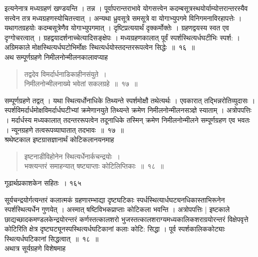\documentclass[11pt, openany]{book}
\begin{document}
\begin{sloppypar}
 इत्यनेनात्र मध्यग्रहणं खण्डयन्ति । तन्न । पूर्वापरान्तराभावे योगसत्त्वेन कदम्बसूत्रस्थयोर्याम्योत्तरान्तरस्यैव सत्त्वेन तत्र मध्यग्रहणस्योचितत्त्वात् । अन्यथा ध्रुवसूत्रे समसूत्रे वा योगाभ्युपगमे विनिगमनाविरहापत्तेः । यथागतग्रहयोः कदम्बसूत्रेणैव योगाभ्युपगमात् । दृष्टिप्रत्ययार्थं दृक्कर्मोक्तेः । ग्रहणद्वयस्य स्वत एव दृग्गोचरत्वात् । ग्रहद्वयादर्शनाच्चेत्यादिसङ्क्षेपः । मध्यग्रहणकालात् पूर्वं स्पर्शस्थित्यर्धघटीभिः स्पर्श: । अग्रिमकाले मोक्षस्थित्यर्धघटोभिर्मोक्षः स्थित्यर्धयोस्तदन्तररूपत्वेन सिद्धेः~॥~१६~॥\\
\noindent अथ सम्पूर्णग्रहणे निमीलनोन्मीलनकालावप्याह\textendash
\end{sloppypar}


\begin{quote}
  {\ssi तद्वदेव विमर्दार्धनाडिकाहीनसंयुते~।\\
निमीलनोन्मीलनाख्ये भवेतां सकलग्रहे~॥~१७~॥}
\end{quote}

\begin{sloppypar}
 सम्पूर्णग्रहणे तद्वत् । यथा स्थित्यर्धोनाधिके तिथ्यन्ते स्पर्शमोक्षौ तथेत्यर्थः । एवकारात् तद्भिन्नरोतिव्युदासः । स्पर्शविमर्दार्धमोक्षविमर्दार्धघटीभ्यां क्रमेणानयुते तिथ्यन्ते क्रमेण निमीलनोन्मीलनसञ्ज्ञे स्याताम् । अत्रोपपत्तिः । मर्दार्धस्य मध्यकालात् तदन्तररूपत्वेन तदूनाधिके तस्मिन् क्रमेण निमीलनोन्मीलने सम्पूर्णग्रहण एव भवतः । न्यूनग्रहणे तत्वरूपव्याघातात् तदभावः~॥~१७~॥\\
 \noindent श्रथेष्टकाल इष्टग्रासज्ञानार्थं कोटिकलानयनमाह\textendash
\end{sloppypar}


\begin{quote}
 {\ssi इष्टनाडीविहोनेन स्थित्यर्धेनार्कचन्द्रयोः~।\\
भक्त्यन्तरं समाहन्यात् षष्ट्याप्ताः कोटिलिप्तिकाः~॥~१८~॥}
\end{quote}

\newpage




 \hspace{3cm} गूढार्थप्रकाशकेन सहितः~। \hfill १६५
\vspace{1cm}

\begin{sloppypar}
 सूर्यचन्द्रयोर्गत्यन्तरं कलात्मकं ग्रहणारम्भाद्या दृष्टघटिकाः स्पर्धस्थित्यार्धघट्यनधिकास्ताभिरूनेन स्पर्शस्थित्यर्धेन गुणयेत् । अस्मात् षष्टिविभकप्राप्ताः कोटिकला भवन्ति । अत्रोपपत्तिः | इष्टकाले छाद्यच्छादकमण्डलकेन्द्रयोरन्तरं कर्णस्तत्कालशरो भुजस्तत्कालशराग्यमध्यकालिकशराग्रयोरन्तरं विक्षेपवृत्ते कोटिरिति क्षेत्र दृष्टघट्यूनस्पस्थित्यर्धघटिकानां कलाः कोटि: सिद्धा । पूर्व स्पर्शकालिककोट्याः स्थित्यर्धघटिकानां सिद्धत्वात्~॥~१८~॥\\
 \noindent अथात्र सूर्यग्रहणे विशेषमाह\textendash
\end{sloppypar}
\end{document}
